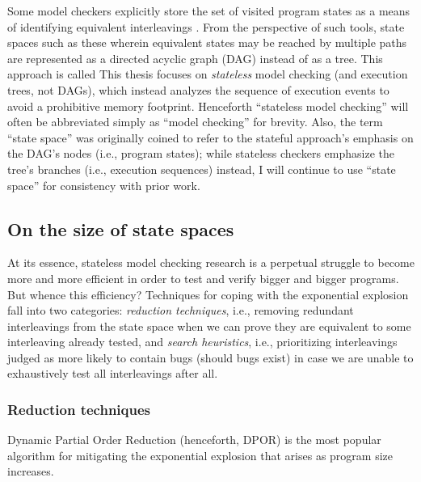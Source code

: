 Some model checkers explicitly store the set of visited program states as a means of identifying equivalent interleavings \cite{spin}.
From the perspective of such tools, state spaces such as these wherein equivalent states may be reached by multiple paths
are represented as a directed acyclic graph (DAG) instead of as a tree.
This approach is called  %
This thesis focuses on {\em stateless} model checking (and execution trees, not DAGs),
which instead analyzes the sequence of execution events to avoid a prohibitive memory footprint.
Henceforth ``stateless model checking'' will often be abbreviated simply as ``model checking'' for brevity.
Also, the term ``state space'' was originally coined to refer to the stateful approach's emphasis on the DAG's nodes
(i.e., program states);
while stateless checkers emphasize the tree's branches (i.e., execution sequences) instead,
I will continue to use ``state space'' for consistency with prior work.

\subsection{On the size of state spaces}

At its essence, stateless model checking research is a perpetual struggle to become more and more efficient in order to test and verify bigger and bigger programs.
But whence this efficiency?
Techniques for coping with the exponential explosion fall into two categories:
{\em reduction techniques},
i.e.,
removing redundant interleavings from the state space when we can prove they are equivalent to some interleaving already tested,
and
{\em search heuristics},
i.e.,
prioritizing interleavings judged as more likely to contain bugs (should bugs exist)
in case we are unable to exhaustively test all interleavings after all.

\subsubsection{Reduction techniques}

Dynamic Partial Order Reduction \cite{dpor} (henceforth, DPOR) is the most popular algorithm for mitigating the exponential explosion that arises as program size increases.

